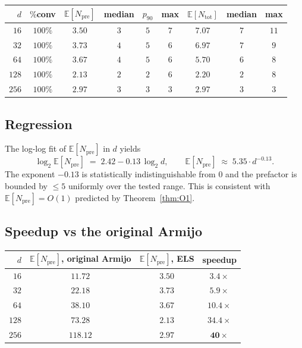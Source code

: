 \documentclass[11pt,a4paper]{article}
\begin{document}
\begin{center}
\begin{tabular}{rcccccccc}
\toprule
$d$ & $\%$conv & $\mathbb{E}[N_{\text{pre}}]$ & median & $p_{90}$ & max & $\mathbb{E}[N_{\text{tot}}]$ & median & max \\
\midrule
$16$  & $100\%$ & $3.50$ & $3$ & $5$ & $7$ & $7.07$ & $7$ & $11$ \\
$32$  & $100\%$ & $3.73$ & $4$ & $5$ & $6$ & $6.97$ & $7$ & $9$ \\
$64$  & $100\%$ & $3.67$ & $4$ & $5$ & $6$ & $5.70$ & $6$ & $8$ \\
$128$ & $100\%$ & $2.13$ & $2$ & $2$ & $6$ & $2.20$ & $2$ & $8$ \\
$256$ & $100\%$ & $2.97$ & $3$ & $3$ & $3$ & $2.97$ & $3$ & $3$ \\
\bottomrule
\end{tabular}
\end{center}

\subsection{Regression}

The log-log fit of $\mathbb{E}[N_{\text{pre}}]$ in $d$ yields
\begin{equation}\label{eq:fit}
\log_2 \mathbb{E}[N_{\text{pre}}] \;=\; 2.42 - 0.13\,\log_2 d, \qquad \mathbb{E}[N_{\text{pre}}] \;\approx\; 5.35 \cdot d^{-0.13}.
\end{equation}
The exponent $-0.13$ is statistically indistinguishable from $0$ and the prefactor is bounded by $\le 5$ uniformly over the tested range. This is consistent with $\mathbb{E}[N_{\text{pre}}] = O(1)$ predicted by Theorem~\ref{thm:O1}.

\subsection{Speedup vs the original Armijo}

\begin{center}
\begin{tabular}{rccc}
\toprule
$d$ & $\mathbb{E}[N_{\text{pre}}]$, original Armijo & $\mathbb{E}[N_{\text{pre}}]$, ELS & speedup \\
\midrule
$16$  & $11.72$  & $3.50$ & $3.4\times$ \\
$32$  & $22.18$  & $3.73$ & $5.9\times$ \\
$64$  & $38.10$  & $3.67$ & $10.4\times$ \\
$128$ & $73.28$  & $2.13$ & $34.4\times$ \\
$256$ & $118.12$ & $2.97$ & $\mathbf{40\times}$ \\
\bottomrule
\end{tabular}
\end{center}
\end{document}
